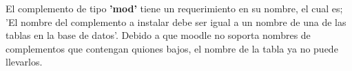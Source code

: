 El complemento de tipo  \textbf{'mod'} tiene un requerimiento en su nombre, el cual es; 'El nombre del complemento a instalar debe ser igual a un nombre
de una de las tablas en la base de datos'. Debido a que moodle no soporta nombres de complementos que contengan quiones bajos, el
nombre de la tabla ya no puede llevarlos.




